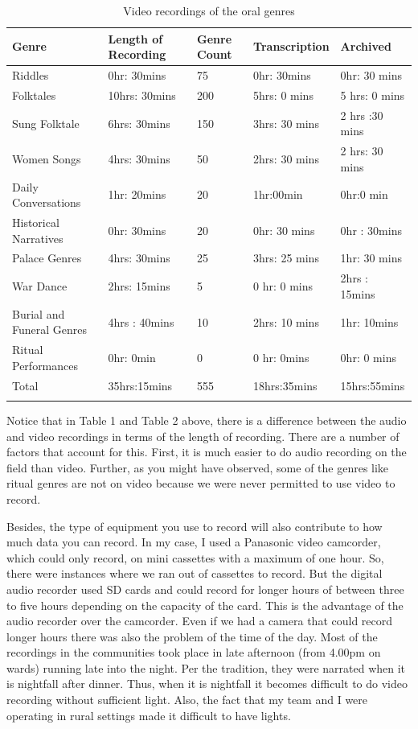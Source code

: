 \documentclass[output=paper,colorlinks,citecolor=brown]{langscibook}
\begin{document}
 \begin{table}
 	    \begin{tabular}{p{2.5cm} p{2.5cm} p{1cm} p{2.5cm} p{2.5cm}  }
    \lsptoprule
     
       \textbf{Genre} & \textbf{Length of Recording} & \textbf{Genre Count }& \textbf{Transcription} & \textbf{Archived} \\
\midrule
    Riddles	& 0hr: 30mins 	& 75	& 0hr: 30mins	& 0hr: 30 mins  \\ 
Folktales	& 10hrs: 30mins 	& 200	& 5hrs: 0 mins	& 5 hrs: 0 mins \\
Sung Folktale	& 6hrs: 30mins 	& 150	& 3hrs: 30 mins	& 2 hrs :30 mins \\  
Women Songs	& 4hrs: 30mins 	& 50	& 2hrs: 30 mins	& 2 hrs: 30 mins \\
Daily Conversations	& 1hr: 20mins 	& 20	& 1hr:00min 	& 0hr:0 min  \\
Historical Narratives	& 0hr: 30mins 	& 20	& 0hr: 30 mins	& 0hr : 30mins \\
Palace Genres	& 4hrs: 30mins 	& 25	& 3hrs: 25 mins	& 1hr: 30 mins \\
War Dance	& 2hrs: 15mins 	& 5	& 0 hr: 0 mins	& 2hrs : 15mins \\
Burial and Funeral Genres	& 4hrs : 40mins 	& 10	& 2hrs: 10 mins	& 1hr: 10mins \\
Ritual Performances	& 0hr: 0min	& 0	& 0 hr: 0mins	& 0hr: 0 mins \\
Total
	& 35hrs:15mins
	& 555	&18hrs:35mins	 & 15hrs:55mins \\
    \lspbottomrule
 
    \end{tabular}
    \caption{Video recordings of the oral genres}
    \label{video}
 \end{table}
Notice that in Table 1 and Table 2 above, there is a difference between the audio and video recordings in terms of the length of recording. There are a number of factors that account for this. First, it is much easier to do audio recording on the field than video. Further, as you might have observed, some of the genres like ritual genres are not on video because we were never permitted to use video to record. 

Besides, the type of equipment you use to record will also contribute to how much data you can record.  In my case, I used a Panasonic video camcorder, which could only record, on mini cassettes with a maximum of one hour. So, there were instances where we ran out of cassettes to record. But the digital audio recorder used SD cards and could record for longer hours of between three to five hours depending on the capacity of the card.  This is the advantage of the audio recorder over the camcorder. Even if we had a camera that could record longer hours there was also the problem of the time of the day. Most of the recordings in the communities took place in  late afternoon (from 4.00pm on wards) running late into the night. Per the tradition, they were narrated when it is nightfall after dinner. Thus, when it is nightfall it becomes difficult to do video recording without sufficient light. Also, the fact that my team and I were operating in rural settings made it difficult to have lights.
\end{document}
